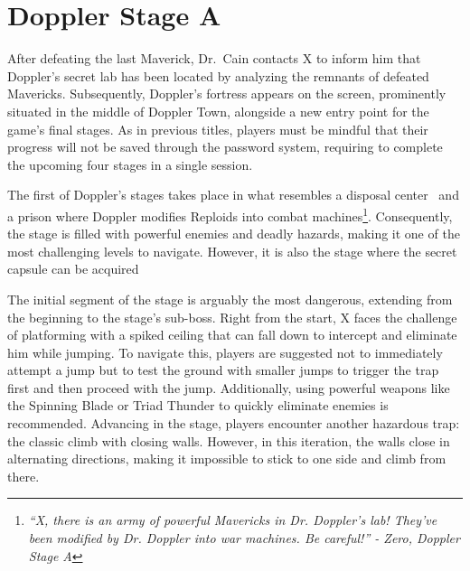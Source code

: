 \section{Doppler Stage A}
After defeating the last Maverick, Dr.~Cain contacts X to inform him that Doppler's secret lab has been located by analyzing the remnants of defeated Mavericks. Subsequently, Doppler's fortress appears on the screen, prominently situated in the middle of Doppler Town, alongside a new entry point for the game's final stages. As in previous titles, players must be mindful that their progress will not be saved through the password system, requiring to complete the upcoming four stages in a single session.

The first of Doppler's stages takes place in what resembles a disposal center~\cite{wiki:Doppler_stage} and a prison where Doppler modifies Reploids into combat machines\footnote{\textit{``X, there is an army of powerful Mavericks in Dr. Doppler’s lab! They’ve been modified by Dr. Doppler into war machines. Be careful!'' - Zero, Doppler Stage A}}. Consequently, the stage is filled with powerful enemies and deadly hazards, making it one of the most challenging levels to navigate. However, it is also the stage where the secret capsule can be acquired

The initial segment of the stage is arguably the most dangerous, extending from the beginning to the stage's sub-boss. Right from the start, X faces the challenge of platforming with a spiked ceiling that can fall down to intercept and eliminate him while jumping. To navigate this, players are suggested not to immediately attempt a jump but to test the ground with smaller jumps to trigger the trap first and then proceed with the jump. Additionally, using powerful weapons like the Spinning Blade or Triad Thunder to quickly eliminate enemies is recommended. Advancing in the stage, players encounter another hazardous trap: the classic climb with closing walls. However, in this iteration, the walls close in alternating directions, making it impossible to stick to one side and climb from there.

